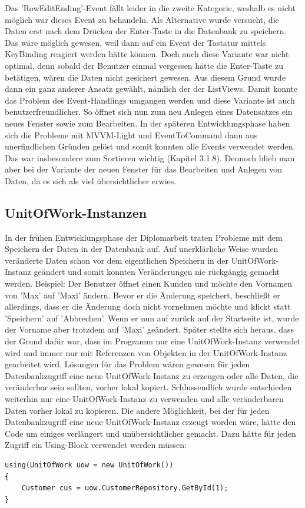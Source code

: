 Das 'RowEditEnding'-Event fällt leider in die zweite Kategorie, weshalb es nicht möglich war dieses Event zu behandeln. Als Alternative wurde versucht, die Daten erst nach dem Drücken der Enter-Taste in die Datenbank zu speichern. Das wäre möglich gewesen, weil dann auf ein Event der Tastatur mittels KeyBinding reagiert werden hätte können. Doch auch diese Variante war nicht optimal, denn sobald der Benutzer einmal vergessen hätte die Enter-Taste zu betätigen, wären die Daten nicht gesichert gewesen. Aus diesem Grund wurde dann ein ganz anderer Ansatz gewählt, nämlich der der ListViews. Damit konnte das Problem des Event-Handlings umgangen werden und diese Variante ist auch benutzerfreundlicher. So öffnet sich nun zum neu Anlegen eines Datensatzes ein neues Fenster sowie zum Bearbeiten. \newline In der späteren Entwicklungsphase haben sich die Probleme mit MVVM-Light und EventToCommand dann aus unerfindlichen Gründen gelöst und somit konnten alle Events verwendet werden. Das war insbesondere zum Sortieren wichtig (Kapitel 3.1.8). Dennoch blieb man aber bei der Variante der neuen Fenster für das Bearbeiten und Anlegen von Daten, da es sich als viel übersichtlicher erwies.
\subsection{UnitOfWork-Instanzen}
In der frühen Entwicklungsphase der Diplomarbeit traten Probleme mit dem Speichern der Daten in der Datenbank auf. Auf unerklärliche Weise wurden veränderte Daten schon vor dem eigentlichen Speichern in der UnitOfWork-Instanz geändert und somit konnten Veränderungen nie rückgängig gemacht werden. \newline Beispiel: Der Benutzer öffnet einen Kunden und möchte den Vornamen von 'Max' auf 'Maxi' ändern. Bevor er die Änderung speichert, beschließt er allerdings, dass er die Änderung doch nicht vornehmen möchte und klickt statt 'Speichern' auf 'Abbrechen'. Wenn er nun auf zurück auf der Startseite ist, wurde der Vorname aber trotzdem auf 'Maxi' geändert. \newline Später stellte sich heraus, dass der Grund dafür war, dass im Programm nur eine UnitOfWork-Instanz verwendet wird und immer nur mit Referenzen von Objekten in der UnitOfWork-Instanz gearbeitet wird. Lösungen für das Problem wären gewesen für jeden Datenbankzugriff eine neue UnitOfWork-Instanz zu erzeugen oder alle Daten, die veränderbar sein sollten, vorher lokal kopiert. Schlussendlich wurde entschieden weiterhin nur eine UnitOfWork-Instanz zu verwenden und alle veränderbaren Daten vorher lokal zu kopieren. Die andere Möglichkeit, bei der für jeden Datenbankzugriff eine neue UnitOfWork-Instanz erzeugt worden wäre, hätte den Code um einiges verlängert und unübersichtlicher gemacht. Dazu hätte für jeden Zugriff ein Using-Block verwendet werden müssen:  
\begin{lstlisting}
using(UnitOfWork uow = new UnitOfWork())
{
	Customer cus = uow.CustomerRepository.GetById(1);
}
\end{lstlisting}